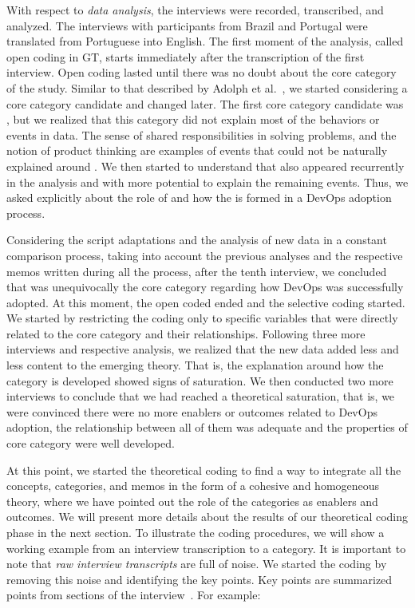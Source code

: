 With respect to \emph{data analysis}, the interviews were
recorded, transcribed, and analyzed. The interviews with participants from
Brazil and Portugal were translated from Portuguese into
English. The first moment of the analysis, called open coding in GT, starts
immediately after the transcription of the first interview.
Open coding lasted until there was no
doubt about the core category of the study. Similar to that described by
Adolph et al.~\cite{adolph2012reconciling}, we started
considering a core category candidate and changed later. The first core category
candidate was , but we realized that this category did not
explain most of the behaviors or events in data. The sense of
shared responsibilities in solving problems, and the notion of product thinking
are examples of events that could not be naturally explained around .
We then started to understand that \cc also appeared recurrently in the analysis
and with more potential to explain the remaining events. Thus, we asked explicitly
about the role of  and how the \cc is formed
in a DevOps adoption process.

Considering the script adaptations and the analysis of new data in a constant
comparison process, taking into account the previous analyses and the
respective memos written during all the process, after the tenth
interview, we concluded that \cc was unequivocally the core
category regarding how DevOps was successfully adopted.
At this moment, the open coded ended and the selective coding started.
We started by restricting the coding only
to specific variables that were directly related to the core category and their
relationships. Following three more interviews and respective analysis, we realized that
the new data added less and less content to the emerging theory. That is, the
explanation around how the \cc category is developed showed signs of saturation.
We then conducted two more interviews to conclude that we had reached a
theoretical saturation, that is, we were convinced there were no more enablers
or outcomes related to DevOps adoption, the relationship between all of them
was adequate and the properties of core category were well developed.

At this point, we started the theoretical coding to find a way to integrate
all the concepts, categories, and memos in the form of a cohesive and
homogeneous theory, where we have pointed out the role of the categories as
enablers and outcomes. We will present more details about
the results of our theoretical coding phase in the next section.
To illustrate the coding procedures, we will show a working example from an
interview transcription to a category.
It is important to note that \emph{raw interview transcripts} are full of noise.
We started the coding by removing this noise and identifying the key points.
Key points are summarized points from sections of the interview~\cite{georgieva2008best}.
For example:

